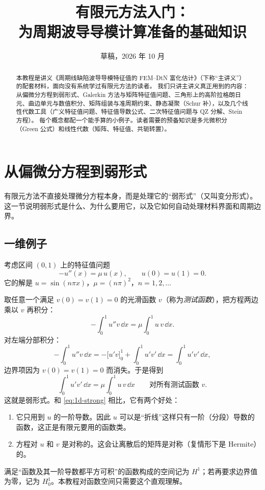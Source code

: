 \documentclass[11pt,a4paper,fontset=fandol]{ctexart}
\title{有限元方法入门：\\为周期波导导模计算准备的基础知识}
\author{}
\date{草稿，2026 年 10 月}
\begin{document}
\maketitle

\begin{abstract}
本教程是讲义《周期线缺陷波导导模特征值的 FEM--DtN 富化估计》（下称“主讲义”）的配套材料，面向没有系统学过有限元方法的读者。
我们只讲主讲义真正用到的内容：从偏微分方程到弱形式、Galerkin 方法与矩阵特征值问题、三角形上的高阶拉格朗日元、曲边单元与数值积分、矩阵组装与准周期约束、静态凝聚（Schur 补），以及几个线性代数工具（广义特征值问题、特征值导数公式、二次特征值问题与 QZ 分解、Stein 方程）。
每个概念都配一个能手算的小例子。读者需要的预备知识是多元微积分（Green 公式）和线性代数（矩阵、特征值、共轭转置）。
\end{abstract}

\tableofcontents

\section{从偏微分方程到弱形式}
\label{sec:weak}

有限元方法不直接处理微分方程本身，而是处理它的“弱形式”（又叫变分形式）。这一节说明弱形式是什么、为什么要用它，以及它如何自动处理材料界面和周期边界。

\subsection{一维例子}

考虑区间 $(0,1)$ 上的特征值问题
\begin{equation}
\label{eq:1d-strong}
-u''(x)=\mu\,u(x),\qquad u(0)=u(1)=0 .
\end{equation}
它的解是 $u=\sin(n\pi x)$，$\mu=(n\pi)^2$，$n=1,2,\dots$

取任意一个满足 $v(0)=v(1)=0$ 的光滑函数 $v$（称为\emph{测试函数}），把方程两边乘以 $v$ 再积分：
\[
-\int_0^1 u''v\,\dd x=\mu\int_0^1 u\,v\,\dd x .
\]
对左端分部积分：
\[
-\int_0^1 u''v\,\dd x=-\bigl[u'v\bigr]_0^1+\int_0^1u'v'\,\dd x=\int_0^1 u'v'\,\dd x ,
\]
边界项因为 $v(0)=v(1)=0$ 而消失。于是得到
\begin{equation}
\label{eq:1d-weak}
\int_0^1 u'v'\,\dd x=\mu\int_0^1 u\,v\,\dd x\qquad\text{对所有测试函数 }v .
\end{equation}
这就是弱形式。和 \eqref{eq:1d-strong} 相比，它有两个好处：
\begin{enumerate}
\item 它只用到 $u$ 的一阶导数。因此 $u$ 可以是“折线”这样只有一阶（分段）导数的函数，这正是有限元要用的函数类。
\item 方程对 $u$ 和 $v$ 是对称的。这会让离散后的矩阵是对称（复情形下是 Hermite）的。
\end{enumerate}
满足“函数及其一阶导数都平方可积”的函数构成的空间记为 $H^1$；若再要求边界值为零，记为 $H^1_0$。本教程对函数空间只需要这个直观理解。
\end{document}
